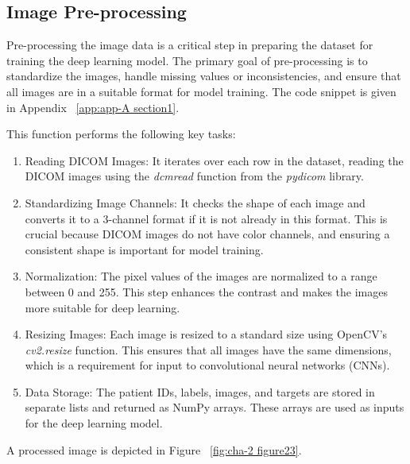 \subsection{Image Pre-processing}
\label{subsec:chap2 section 2.1}

Pre-processing the image data is a critical step in preparing the dataset for training the deep learning model. The primary goal of pre-processing is to standardize the images, handle missing values or inconsistencies, and ensure that all images are in a suitable format for model training. The code snippet is given in Appendix ~\ref{app:app-A section1}.

This function performs the following key tasks:
\begin{enumerate}
    \item Reading DICOM Images: It iterates over each row in the dataset, reading the DICOM images using the \emph{dcmread} function from the \emph{pydicom} library.
    \item Standardizing Image Channels: It checks the shape of each image and converts it to a 3-channel format if it is not already in this format. This is crucial because DICOM images do not have color channels, and ensuring a consistent shape is important for model training.
    \item Normalization: The pixel values of the images are normalized to a range between 0 and 255. This step enhances the contrast and makes the images more suitable for deep learning.
    \item Resizing Images: Each image is resized to a standard size using OpenCV's \emph{cv2.resize} function. This ensures that all images have the same dimensions, which is a requirement for input to convolutional neural networks (CNNs).
    \item Data Storage: The patient IDs, labels, images, and targets are stored in separate lists and returned as NumPy arrays. These arrays are used as inputs for the deep learning model.
\end{enumerate}

A processed image is depicted in Figure ~\ref{fig:cha-2 figure23}.

